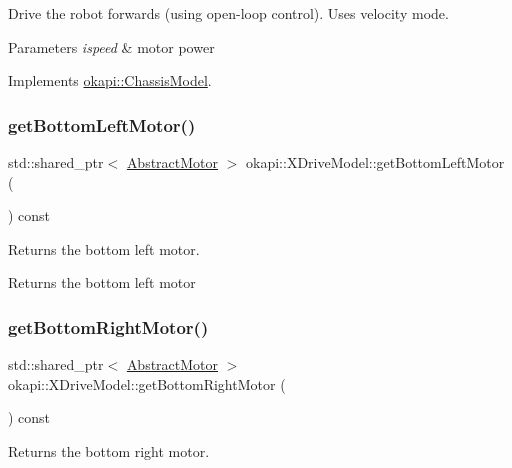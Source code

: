 Drive the robot forwards (using open-\/loop control). Uses velocity mode.


\begin{DoxyParams}{Parameters}
{\em ispeed} & motor power \\
\hline
\end{DoxyParams}


Implements \mbox{\hyperlink{classokapi_1_1ChassisModel_ae39e8ccd15b6f84e32cd21fe99bdd6c9}{okapi\+::\+Chassis\+Model}}.

\mbox{\label{classokapi_1_1XDriveModel_a9d009ced4cfce5d1ba9ac2c4ad67212a}} 
\subsubsection{\texorpdfstring{getBottomLeftMotor()}{getBottomLeftMotor()}}
{\footnotesize\ttfamily std\+::shared\+\_\+ptr$<$ \mbox{\hyperlink{classokapi_1_1AbstractMotor}{Abstract\+Motor}} $>$ okapi\+::\+X\+Drive\+Model\+::get\+Bottom\+Left\+Motor (\begin{DoxyParamCaption}{ }\end{DoxyParamCaption}) const}

Returns the bottom left motor.

\begin{DoxyReturn}{Returns}
the bottom left motor 
\end{DoxyReturn}
\mbox{\label{classokapi_1_1XDriveModel_aa7305b4d70feaf3d7201c4b60f29b289}} 
\subsubsection{\texorpdfstring{getBottomRightMotor()}{getBottomRightMotor()}}
{\footnotesize\ttfamily std\+::shared\+\_\+ptr$<$ \mbox{\hyperlink{classokapi_1_1AbstractMotor}{Abstract\+Motor}} $>$ okapi\+::\+X\+Drive\+Model\+::get\+Bottom\+Right\+Motor (\begin{DoxyParamCaption}{ }\end{DoxyParamCaption}) const}

Returns the bottom right motor.

